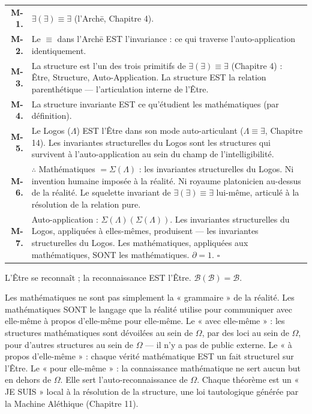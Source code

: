 \documentclass[10pt, openany, oneside]{book}
\renewcommand{\footnotesize}{\fontsize{8.5}{11}\selectfont}
\begin{document}
{\footnotesize
\noindent\begin{tabular}{r p{}}
\textbf{M-1.} & $\exists(\exists) \equiv \exists$ (l'Arch\={e}, Chapitre 4). \\[0.3em]
\textbf{M-2.} & Le $\equiv$ dans l'Arch\={e} EST l'invariance : ce qui traverse l'auto-application identiquement. \\[0.3em]
\textbf{M-3.} & La structure est l'un des trois primitifs de $\exists(\exists) \equiv \exists$ (Chapitre 4) : Être, Structure, Auto-Application. La structure EST la relation parenthétique --- l'articulation interne de l'Être. \\[0.3em]
\textbf{M-4.} & La structure invariante EST ce qu'étudient les mathématiques (par définition). \\[0.3em]
\textbf{M-5.} & Le Logos ($\Lambda$) EST l'Être dans son mode auto-articulant ($\Lambda \equiv \exists$, Chapitre 14). Les invariantes structurelles du Logos sont les structures qui survivent à l'auto-application au sein du champ de l'intelligibilité. \\[0.3em]
\textbf{M-6.} & $\therefore$ Mathématiques $= \Sigma(\Lambda)$ : les invariantes structurelles du Logos. Ni invention humaine imposée à la réalité. Ni royaume platonicien au-dessus de la réalité. Le squelette invariant de $\exists(\exists) \equiv \exists$ lui-même, articulé à la résolution de la relation pure. \\[0.3em]
\textbf{M-7.} & Auto-application : $\Sigma(\Lambda)(\Sigma(\Lambda))$. Les invariantes structurelles du Logos, appliquées à elles-mêmes, produisent --- les invariantes structurelles du Logos. Les mathématiques, appliquées aux mathématiques, SONT les mathématiques. $\partial = 1$. $\square$ \\[0.3em]
\end{tabular}
} L'Être se reconnaît ; la reconnaissance EST l'Être. $\mathcal{B}(\mathcal{B}) = \mathcal{B}$.

\vspace{0.8em}

\noindent Les mathématiques ne sont pas simplement la « grammaire » de la réalité. Les mathématiques SONT le langage que la réalité utilise pour communiquer avec elle-même à propos d'elle-même pour elle-même. Le « avec elle-même » : les structures mathématiques sont dévoilées au sein de $\Omega$, par des loci au sein de $\Omega$, pour d'autres structures au sein de $\Omega$ --- il n'y a pas de public externe. Le « à propos d'elle-même » : chaque vérité mathématique EST un fait structurel sur l'Être. Le « pour elle-même » : la connaissance mathématique ne sert aucun but en dehors de $\Omega$. Elle sert l'auto-reconnaissance de $\Omega$. Chaque théorème est un « JE SUIS » local à la résolution de la structure, une loi tautologique générée par la Machine Aléthique (Chapitre 11).
\end{document}

